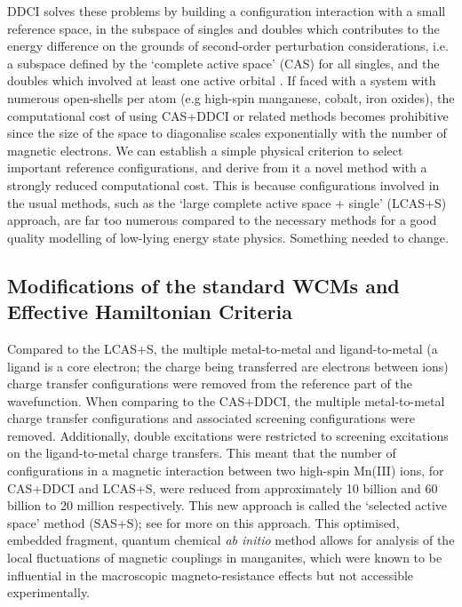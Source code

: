 \documentclass[10pt]{article}
\begin{document}
DDCI solves these problems by building a configuration interaction with a small reference space, in the subspace of singles and doubles which contributes to the energy difference on the grounds of second-order perturbation considerations, i.e. a subspace defined by the `complete active space' (CAS) for all singles, and the doubles which involved at least one active orbital \cite{garcia1997application}. If faced with a system with numerous open-shells per atom (e.g high-spin manganese, cobalt, iron oxides), the computational cost of using CAS+DDCI or related methods becomes prohibitive since the size of the space to diagonalise scales exponentially with the number of magnetic electrons. We can establish a simple physical criterion to select important reference configurations, and derive from it a novel method with a strongly reduced computational cost. This is because configurations involved in the usual methods, such as the `large complete active space + single' (LCAS+S) approach, are far too numerous compared to the necessary methods for a good quality modelling of low-lying energy state physics. Something needed to change.

\subsection{Modifications of the standard WCMs and Effective Hamiltonian Criteria}

Compared to the LCAS+S, the multiple metal-to-metal and ligand-to-metal (a ligand is a core electron; the charge being transferred are electrons between ions) charge transfer configurations were removed from the reference part of the wavefunction. When comparing to the CAS+DDCI, the multiple metal-to-metal charge transfer configurations and associated screening configurations were removed. Additionally, double excitations were restricted to screening excitations on the ligand-to-metal charge transfers. This meant that the number of configurations in a magnetic interaction between two high-spin Mn(III) ions, for CAS+DDCI and LCAS+S, were reduced from approximately 10 billion and 60 billion  to 20 million respectively. This new approach is called the `selected active space' method (SAS+S); see \cite{gelle2009accurate} for more on this approach. This optimised, embedded fragment, quantum chemical {\it ab initio} method allows for analysis of the local fluctuations of magnetic couplings in manganites, which were known to be influential in the macroscopic magneto-resistance effects but not accessible experimentally.
\end{document}
